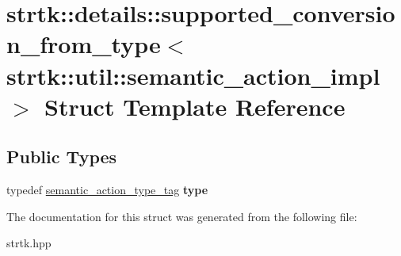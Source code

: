 \hypertarget{structstrtk_1_1details_1_1supported__conversion__from__type_3_01strtk_1_1util_1_1semantic__action__impl_01_4}{\section{strtk\-:\-:details\-:\-:supported\-\_\-conversion\-\_\-from\-\_\-type$<$ strtk\-:\-:util\-:\-:semantic\-\_\-action\-\_\-impl $>$ Struct Template Reference}
\label{structstrtk_1_1details_1_1supported__conversion__from__type_3_01strtk_1_1util_1_1semantic__action__impl_01_4}
}
\subsection*{Public Types}
\begin{DoxyCompactItemize}
\item 
\hypertarget{structstrtk_1_1details_1_1supported__conversion__from__type_3_01strtk_1_1util_1_1semantic__action__impl_01_4_abbbf56e1c2f770dc343a11aea3f42a4f}{typedef \hyperlink{structstrtk_1_1details_1_1semantic__action__type__tag}{semantic\-\_\-action\-\_\-type\-\_\-tag} {\bfseries type}}\label{structstrtk_1_1details_1_1supported__conversion__from__type_3_01strtk_1_1util_1_1semantic__action__impl_01_4_abbbf56e1c2f770dc343a11aea3f42a4f}

\end{DoxyCompactItemize}


The documentation for this struct was generated from the following file\-:\begin{DoxyCompactItemize}
\item 
strtk.\-hpp\end{DoxyCompactItemize}

